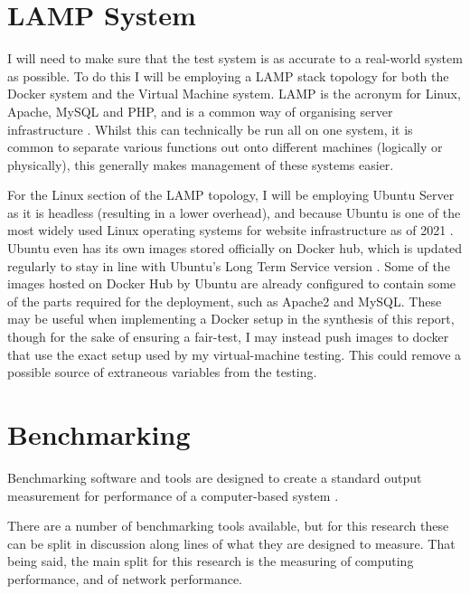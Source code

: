 \section{LAMP System}
\label{sec:LAMPsystem}
I will need to make sure that the test system is as accurate to a real-world system as possible. To do this I will be employing a LAMP stack topology for both the Docker system and the Virtual Machine system. LAMP is the acronym for Linux, Apache, MySQL and PHP, and is a common way of organising server infrastructure \citep{LAMPstack}. Whilst this can technically be run all on one system, it is common to separate various functions out onto different machines (logically or physically), this generally makes management of these systems easier.

For the Linux section of the LAMP topology, I will be employing Ubuntu Server as it is headless (resulting in a lower overhead), and because Ubuntu is one of the most widely used Linux operating systems for website infrastructure as of 2021 \citep{w3techUbuntu}. Ubuntu even has its own images stored officially on Docker hub, which is updated regularly to stay in line with Ubuntu's Long Term Service version \citep{ubuntuDocker}. Some of the images hosted on Docker Hub by Ubuntu \citep{ubuntuDockerProfile} are already configured to contain some of the parts required for the deployment, such as Apache2 and MySQL. These may be useful when implementing a Docker setup in the synthesis of this report, though for the sake of ensuring a fair-test, I may instead push images to docker that use the exact setup used by my virtual-machine testing. This could remove a possible source of extraneous variables from the testing.

\section{Benchmarking}
\label{sec:Benchmarking}
Benchmarking software and tools are designed to create a standard output measurement for performance of a computer-based system \citep{fleming1986}.

There are a  number of benchmarking tools available, but for this research these can be split in discussion along lines of what they are designed to measure. That being said, the main split for this research is the measuring of computing performance, and of network performance.


